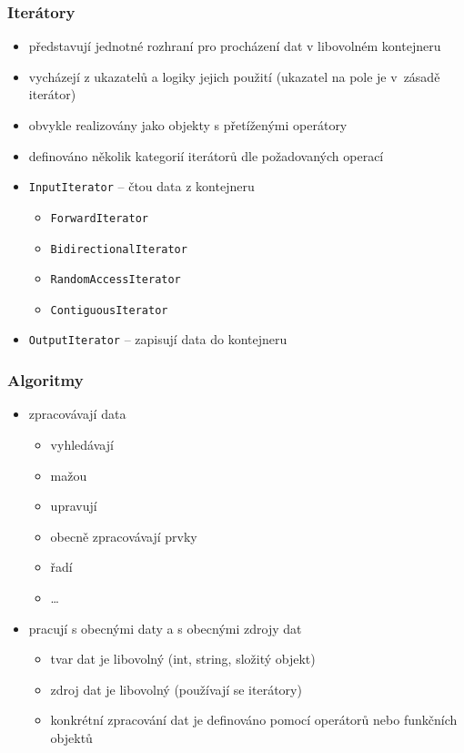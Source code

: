 \begin{frame}[fragile]
\frametitle{Iterátory}
\begin{block}{}
\begin{itemize}
\item představují jednotné rozhraní pro procházení dat v libovolném kontejneru
\item vycházejí z ukazatelů a logiky jejich použití (ukazatel na pole je v~zásadě iterátor)
\item obvykle realizovány jako objekty s přetíženými operátory
\item definováno několik kategorií iterátorů dle požadovaných operací
\end{itemize}
\end{block}

\begin{block}{}
\begin{itemize}
\item \lstinline|InputIterator| -- čtou data z kontejneru
\begin{itemize}
\item \lstinline|ForwardIterator|
\item \lstinline|BidirectionalIterator|
\item \lstinline|RandomAccessIterator|
\item \lstinline|ContiguousIterator|
\end{itemize}
\item \lstinline|OutputIterator| -- zapisují data do kontejneru
\end{itemize}
\end{block}
\end{frame}






\begin{frame}[fragile]
\frametitle{Algoritmy}
\begin{block}{}
\begin{itemize}
\item zpracovávají data
\begin{itemize}
\item vyhledávají
\item mažou
\item upravují
\item obecně zpracovávají prvky
\item řadí
\item \ldots
\end{itemize}
\item pracují s obecnými daty a s obecnými zdrojy dat
\begin{itemize}
\item tvar dat je libovolný (int, string, složitý objekt)
\item zdroj dat je libovolný (používají se iterátory)
\item konkrétní zpracování dat je definováno pomocí operátorů nebo funkčních objektů
\end{itemize}
\end{itemize}
\end{block}
\end{frame}



